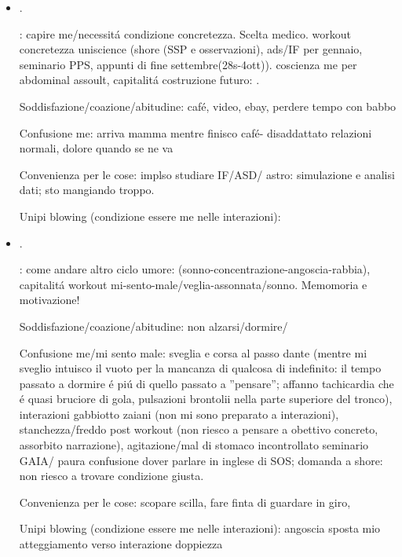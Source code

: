 \begin{itemize}
Unipi blowing (condizione essere me nelle interazioni): capitalit\'a sforzo separare interazione/essere me,

\item {}.

: capire me/necessit\'a condizione concretezza. Scelta medico. workout concretezza uniscience (shore (SSP e osservazioni), ads/IF per gennaio, seminario PPS, appunti di fine settembre(28s-4ott)). coscienza me per abdominal assoult, capitalit\'a costruzione futuro: .

Soddisfazione/coazione/abitudine: caf\'e, video, ebay, perdere tempo con babbo

Confusione me: arriva mamma mentre finisco caf\'e- disaddattato relazioni normali, dolore quando se ne va

Convenienza per le cose: implso studiare IF/ASD/ astro: simulazione e analisi dati; sto mangiando troppo.

Unipi blowing (condizione essere me nelle interazioni): 

\item {}.

: come andare altro ciclo umore: (sonno-concentrazione-angoscia-rabbia), capitalit\'a workout mi-sento-male/veglia-assonnata/sonno. Memomoria e motivazione!

Soddisfazione/coazione/abitudine: non alzarsi/dormire/

Confusione me/mi sento male: sveglia e corsa al passo dante (mentre mi sveglio intuisco il vuoto per la mancanza di qualcosa di indefinito: il tempo passato a dormire \'e pi\'u di quello passato a ''pensare''; affanno tachicardia che \'e quasi bruciore di gola, pulsazioni brontolii nella parte superiore del tronco), interazioni gabbiotto zaiani (non mi sono preparato a interazioni), stanchezza/freddo post workout (non riesco a pensare a obettivo concreto, assorbito narrazione), agitazione/mal di stomaco incontrollato seminario GAIA/ paura confusione dover parlare in inglese di SOS; domanda a shore: non riesco a trovare condizione giusta.

Convenienza per le cose: scopare scilla, fare finta di guardare in giro, 

Unipi blowing (condizione essere me nelle interazioni): angoscia sposta mio atteggiamento verso interazione doppiezza


\end{itemize}
